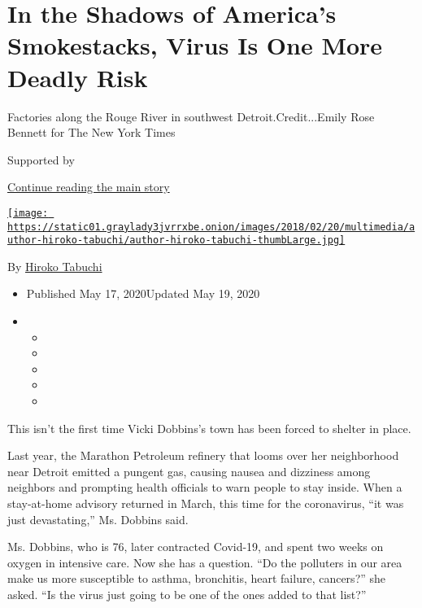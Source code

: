 \hypertarget{in-the-shadows-of-americas-smokestacks-virus-is-one-more-deadly-risk}{%
\section{In the Shadows of America's Smokestacks, Virus Is One More
Deadly
Risk}\label{in-the-shadows-of-americas-smokestacks-virus-is-one-more-deadly-risk}}

Factories along the Rouge River in southwest Detroit.Credit...Emily Rose
Bennett for The New York Times

Supported by

\protect\hyperlink{after-sponsor}{Continue reading the main story}

\href{https://www.nytimes3xbfgragh.onion/by/hiroko-tabuchi}{\texttt{[image: https://static01.graylady3jvrrxbe.onion/images/2018/02/20/multimedia/author-hiroko-tabuchi/author-hiroko-tabuchi-thumbLarge.jpg]}}

By \href{https://www.nytimes3xbfgragh.onion/by/hiroko-tabuchi}{Hiroko
Tabuchi}

\begin{itemize}
\item
  Published May 17, 2020Updated May 19, 2020
\item
  \begin{itemize}
  \item
  \item
  \item
  \item
  \item
  \end{itemize}
\end{itemize}

This isn't the first time Vicki Dobbins's town has been forced to
shelter in place.

Last year, the Marathon Petroleum refinery that looms over her
neighborhood near Detroit emitted a pungent gas, causing nausea and
dizziness among neighbors and prompting health officials to warn people
to stay inside. When a stay-at-home advisory returned in March, this
time for the coronavirus, ``it was just devastating,'' Ms. Dobbins said.

Ms. Dobbins, who is 76, later contracted Covid-19, and spent two weeks
on oxygen in intensive care. Now she has a question. ``Do the polluters
in our area make us more susceptible to asthma, bronchitis, heart
failure, cancers?'' she asked. ``Is the virus just going to be one of
the ones added to that list?''

